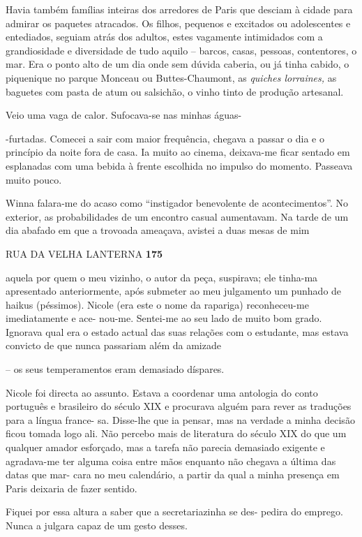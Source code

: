 Havia também famílias inteiras dos arredores de Paris que desciam à
cidade para admirar os paquetes atracados. Os filhos, pequenos e
excitados ou adolescentes e entediados, seguiam atrás dos adultos, estes
vagamente intimidados com a grandiosidade e diversidade de tudo aquilo
-- barcos, casas, pessoas, contentores, o mar. Era o ponto alto de um
dia onde sem dúvida caberia, ou já tinha cabido, o piquenique no parque
Monceau ou Buttes-Chaumont, as \emph{quiches lorraines, }as baguetes com
pasta de atum ou salsichão, o vinho tinto de produção artesanal.

Veio uma vaga de calor. Sufocava-se nas minhas águas-

-furtadas. Comecei a sair com maior frequência, chegava a passar o dia e
o princípio da noite fora de casa. Ia muito ao cinema, deixava-me ficar
sentado em esplanadas com uma bebida à frente escolhida no impulso do
momento. Passeava muito pouco.

Winna falara-me do acaso como ``instigador benevolente de
acontecimentos''. No exterior, as probabilidades de um encontro casual
aumentavam. Na tarde de um dia abafado em que a trovoada ameaçava,
avistei a duas mesas de mim

RUA DA VELHA LANTERNA \textbf{175}

aquela por quem o meu vizinho, o autor da peça, suspirava; ele tinha-ma
apresentado anteriormente, após submeter ao meu julgamento um punhado de
haikus (péssimos). Nicole (era este o nome da rapariga) reconheceu-me
imediatamente e ace- nou-me. Sentei-me ao seu lado de muito bom grado.
Ignorava qual era o estado actual das suas relações com o estudante, mas
estava convicto de que nunca passariam além da amizade

-- os seus temperamentos eram demasiado díspares.

Nicole foi directa ao assunto. Estava a coordenar uma antologia do conto
português e brasileiro do século XIX e procurava alguém para rever as
traduções para a língua france- sa. Disse-lhe que ia pensar, mas na
verdade a minha decisão ficou tomada logo ali. Não percebo mais de
literatura do século XIX do que um qualquer amador esforçado, mas a
tarefa não parecia demasiado exigente e agradava-me ter alguma coisa
entre mãos enquanto não chegava a última das datas que mar- cara no meu
calendário, a partir da qual a minha presença em Paris deixaria de fazer
sentido.

Fiquei por essa altura a saber que a secretariazinha se des- pedira do
emprego. Nunca a julgara capaz de um gesto desses.

